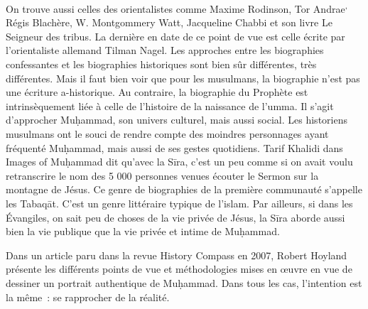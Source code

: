 On trouve aussi celles des orientalistes comme Maxime
Rodinson, Tor
Andrae\textsuperscript{,} Régis Blachère, W.
Montgommery Watt, Jacqueline Chabbi et son
livre {Le Seigneur des tribus}. La dernière en date de ce point de
vue est celle écrite par l'orientaliste allemand Tilman Nagel. Les
approches entre les biographies confessantes et les biographies
historiques sont bien sûr différentes, très différentes. Mais il faut
bien voir que pour les musulmans, la biographie n'est pas une écriture
a-historique. Au contraire, la biographie du Prophète est
intrinsèquement liée à celle de l'histoire de la naissance de l'umma. Il
s'agit d'approcher Muḥammad, son univers culturel, mais aussi social.
Les historiens musulmans ont le souci de rendre compte des moindres
personnages ayant fréquenté Muḥammad, mais aussi de ses gestes
quotidiens. Tarif Khalidi dans {Images of Muḥammad} dit qu'avec la
Sīra, c'est un peu comme si on avait voulu retranscrire le nom des 5 000
personnes venues écouter le Sermon sur la montagne de Jésus. Ce genre de
biographies de la première communauté s'appelle les {Tabaqāt}.
C'est un genre littéraire typique de l'islam. Par ailleurs, si dans les
Évangiles, on sait peu de choses de la vie privée de Jésus, la Sīra
aborde aussi bien la vie publique que la vie privée et intime de
Muḥammad.

Dans un article paru dans la revue {History Compass} en 2007,
Robert Hoyland présente les différents points de vue et méthodologies
mises en œuvre en vue de dessiner un portrait authentique de
Muḥammad. Dans tous les cas, l'intention est la même~: se rapprocher
de la réalité.

